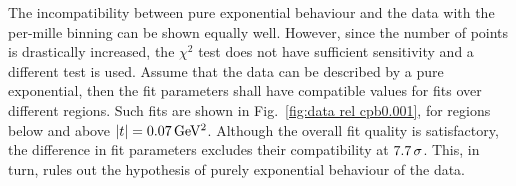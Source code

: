 \documentclass[twocolumn,a4paper,superscriptaddress,preprintnumbers,showpacs,nofootinbib]{revtex4-1}
\def\un#1{\,{\rm #1}}
\begin{document}

The incompatibility between pure exponential behaviour and the data with the per-mille binning can be shown equally well. However, since the number of points is drastically increased, the $\chi^2$ test does not have sufficient sensitivity and a different test is used. Assume that the data can be described by a pure exponential, then the fit parameters shall have compatible values for fits over different regions. Such fits are shown in Fig.~\ref{fig:data rel cpb0.001}, for regions below and above $|t| = 0.07\un{GeV^2}$. Although the overall fit quality is satisfactory, the difference in fit parameters excludes their compatibility at $7.7\un{\sigma}$. This, in turn, rules out the hypothesis of purely exponential behaviour of the data.

\end{document}
